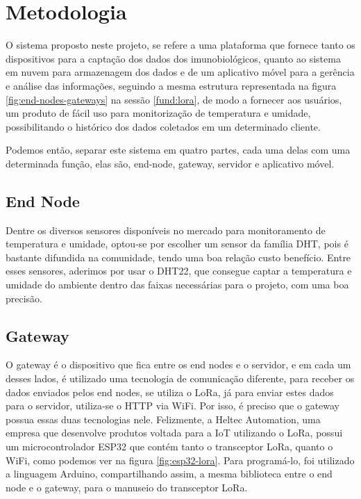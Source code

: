 \chapter{Metodologia}
\label{cap:metodologia}
O sistema proposto neste projeto, se refere a uma plataforma que fornece tanto os dispositivos para a captação dos dados dos imunobiológicos, quanto ao sistema em nuvem para armazenagem dos dados e de um aplicativo móvel para a gerência e análise das informações, seguindo a mesma estrutura representada na figura \ref{fig:end-nodes-gateways} na sessão \ref{fund:lora}, de modo a fornecer aos usuários, um produto  de fácil uso para monitorização de temperatura e umidade, possibilitando o histórico dos dados coletados em um determinado cliente.

Podemos então, separar este sistema em quatro partes, cada uma delas com uma determinada função, elas são, end-node, gateway, servidor e aplicativo móvel.

\section{End Node}
\label{metod:node}
Dentre os diversos sensores disponíveis no mercado para monitoramento de temperatura e umidade, optou-se por escolher um sensor da família DHT, pois é bastante difundida na comunidade, tendo uma boa relação custo benefício. Entre esses sensores, aderimos por usar o DHT22, que consegue captar a temperatura e umidade do ambiente dentro das faixas necessárias para o projeto, com uma boa precisão.

\section{Gateway}
\label{metod:gateway}
O gateway é o dispositivo que fica entre os end nodes e o servidor, e em cada um desses lados, é utilizado uma tecnologia de comunicação diferente, para receber os dados enviados pelos end nodes, se utiliza o LoRa, já para enviar estes dados para o servidor, utiliza-se o HTTP via WiFi. Por isso, é preciso que o gateway possua essas duas tecnologias nele. Felizmente, a Heltec Automation, uma empresa que desenvolve produtos voltada para a IoT utilizando o LoRa, possui um microcontrolador ESP32 que contém tanto o transceptor LoRa, quanto o WiFi, como podemos ver na figura \ref{fig:esp32-lora}. Para programá-lo, foi utilizado a linguagem Arduino, compartilhando assim, a mesma biblioteca entre o end node e o gateway, para o manuseio do transceptor LoRa.

